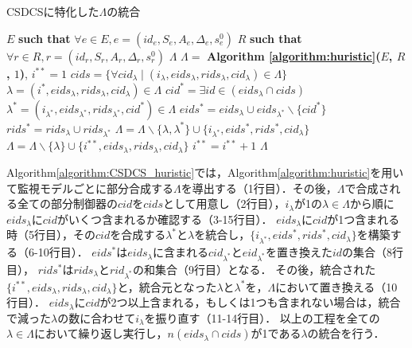 \begin{algorithm}[h]
\caption{CSDCSに特化した$\Lambda$の統合}
\label{algorithm:CSDCS_huristic}
\begin{algorithmic}[1]
\renewcommand{\algorithmicrequire}{\textbf{Input:}}
\renewcommand{\algorithmicensure}{\textbf{Output:}}
\REQUIRE $E$ {\bf such that} $\forall e \in E, e = (id_{e}, S_{e}, A_{e}, \Delta_{e}, s^0_{e})$
\REQUIRE $R$ {\bf such that} $\forall r \in R, r = (id_{r}, S_{r}, A_{r}, \Delta_{r}, s^0_{r})$
\ENSURE  $\Lambda$
\STATE $\Lambda =$ {\bf Algorithm \ref{algorithm:huristic}($E$, $R$, $1$)}, \;\;$i^{**} = 1$
\STATE $cids = \{\forall cid_{\lambda} \mid (i_{\lambda}, eids_{\lambda}, rids_{\lambda}, cid_{\lambda}) \in \Lambda\}$
    \STATE $\lambda = (i^*, eids_{\lambda}, rids_{\lambda}, cid_{\lambda}) \in \Lambda$
        \STATE $cid^* = \exists id \in (eids_{\lambda} \cap cids)$
        \STATE $\lambda^* = (i_{\lambda^*}, eids_{\lambda^*}, rids_{\lambda^*}, cid^*) \in \Lambda$
        \STATE $eids^* = eids_{\lambda} \cup eids_{\lambda^*} \backslash \{cid^*\}$
        \STATE $rids^* = rids_{\lambda} \cup rids_{\lambda^*}$
        \STATE $\Lambda = \Lambda \backslash \{\lambda ,\lambda^*\} \cup \{i_{\lambda^*}, eids^*, rids^*, cid_{\lambda}\}$
    \ELSE
        \STATE $\Lambda = \Lambda \backslash \{\lambda\} \cup \{i^{**}, eids_{\lambda}, rids_{\lambda}, cid_{\lambda}\}$
        \STATE $i^{**} = i^{**} + 1$
    \ENDIF
\ENDFOR
{} $\Lambda$
\end{algorithmic}
\end{algorithm}

Algorithm\ref{algorithm:CSDCS_huristic}では，Algorithm\ref{algorithm:huristic}を用いて監視モデルごとに部分合成する$\Lambda$を導出する（1行目）．その後，$\Lambda$で合成される全ての部分制御器の$cid$を$cids$として用意し（2行目），$i_{\lambda}$が1の$\lambda \in \Lambda$から順に$eids_{\lambda}$に$cid$がいくつ含まれるか確認する（3-15行目）．
$eids_{\lambda}$に$cid$が1つ含まれる時（5行目），その$cid$を合成する$\lambda^*$と$\lambda$を統合し，$\{i_{\lambda^*}, eids^*, rids^*, cid_{\lambda}\}$を構築する（6-10行目）．
$eids^*$は$eids_{\lambda}$に含まれる$cid_{\lambda^*}$と$eid_{\lambda^*}$を置き換えた$id$の集合（8行目），
$rids^*$は$rids_{\lambda}$と$rid_{\lambda^*}$の和集合（9行目）となる．
その後，統合された$\{i^{**}, eids_{\lambda}, rids_{\lambda}, cid_{\lambda}\}$と，統合元となった$\lambda$と$\lambda^*$を，$\Lambda$において置き換える（10行目）．
$eids_{\lambda}$に$cid$が2つ以上含まれる，もしくは1つも含まれない場合は，統合で減った$\lambda$の数に合わせて$i_{\lambda}$を振り直す（11-14行目）．
以上の工程を全ての$\lambda \in \Lambda$において繰り返し実行し，$n(eids_{\lambda} \cap cids)$が1である$\lambda$の統合を行う．

